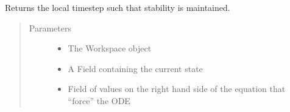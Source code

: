 \documentclass[letterpaper,10pt,english]{sphinxmanual}
\begin{document}
\begin{fulllineitems}
\begin{fulllineitems}
\begin{quote}
\begin{description}
\end{description}\end{quote}

\end{fulllineitems}


\begin{fulllineitems}
\label{\detokenize{autoapi/ImplicitEuler/index:ImplicitEuler.ImplicitEuler.step}}
\sphinxAtStartPar
Returns the local timestep such that stability is maintained.
\begin{quote}\begin{description}
\item[{Parameters}] \leavevmode\begin{itemize}
\item {} 
\sphinxAtStartPar
{} \textendash{} The Workspace object

\item {} 
\sphinxAtStartPar
{} \textendash{} A Field containing the current state

\item {} 
\sphinxAtStartPar
{} \textendash{} Field of values on the right hand side of the equation that “force” the ODE

\end{itemize}

\end{description}\end{quote}

\end{fulllineitems}


\begin{fulllineitems}
\label{\detokenize{autoapi/ImplicitEuler/index:ImplicitEuler.ImplicitEuler.__check_vars}}
\end{fulllineitems}


\end{fulllineitems}
\end{document}
